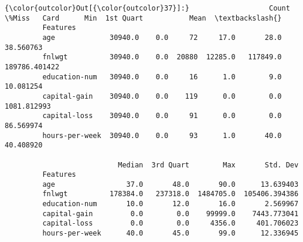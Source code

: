 \documentclass[11pt]{article}
\begin{document}
\begin{Verbatim}[commandchars=\\\{\}]
{\color{outcolor}Out[{\color{outcolor}37}]:}                   Count  \%Miss   Card      Min  1st Quart           Mean  \textbackslash{}
         Features                                                                   
         age             30940.0    0.0     72     17.0       28.0      38.560763   
         fnlwgt          30940.0    0.0  20880  12285.0   117849.0  189786.401422   
         education-num   30940.0    0.0     16      1.0        9.0      10.081254   
         capital-gain    30940.0    0.0    119      0.0        0.0    1081.812993   
         capital-loss    30940.0    0.0     91      0.0        0.0      86.569974   
         hours-per-week  30940.0    0.0     93      1.0       40.0      40.408920   
         
                           Median  3rd Quart        Max       Std. Dev  
         Features                                                       
         age                 37.0       48.0       90.0      13.639403  
         fnlwgt          178384.0   237318.0  1484705.0  105406.394386  
         education-num       10.0       12.0       16.0       2.569967  
         capital-gain         0.0        0.0    99999.0    7443.773041  
         capital-loss         0.0        0.0     4356.0     401.706023  
         hours-per-week      40.0       45.0       99.0      12.336945  
\end{Verbatim}
            
\end{document}
